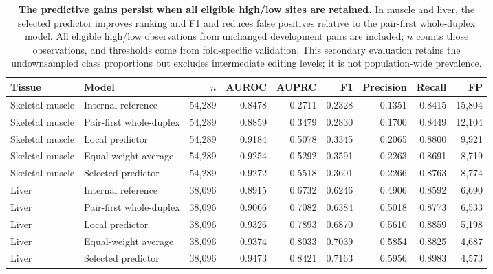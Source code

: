 \begin{table}[H]
\centering
\caption{\textbf{The predictive gains persist when all eligible high/low sites are retained.} In muscle and liver, the selected predictor improves ranking and F1 and reduces false positives relative to the pair-first whole-duplex model. All eligible high/low observations from unchanged development pairs are included; $n$ counts those observations, and thresholds come from fold-specific validation. This secondary evaluation retains the undownsampled class proportions but excludes intermediate editing levels; it is not population-wide prevalence.}\label{tab:natural}
\begin{tabular}{llrrrrrrr}
\toprule
Tissue & Model & $n$ & AUROC & AUPRC & F1 & Precision & Recall & FP \\
\midrule
Skeletal muscle & Internal reference & 54,289 & 0.8478 & 0.2711 & 0.2328 & 0.1351 & 0.8415 & 15,804 \\
Skeletal muscle & Pair-first whole-duplex & 54,289 & 0.8859 & 0.3479 & 0.2830 & 0.1700 & 0.8449 & 12,104 \\
Skeletal muscle & Local predictor & 54,289 & 0.9184 & 0.5078 & 0.3345 & 0.2065 & 0.8800 & 9,921 \\
Skeletal muscle & Equal-weight average & 54,289 & 0.9254 & 0.5292 & 0.3591 & 0.2263 & 0.8691 & 8,719 \\
Skeletal muscle & Selected predictor & 54,289 & 0.9272 & 0.5518 & 0.3601 & 0.2266 & 0.8763 & 8,774 \\
Liver & Internal reference & 38,096 & 0.8915 & 0.6732 & 0.6246 & 0.4906 & 0.8592 & 6,690 \\
Liver & Pair-first whole-duplex & 38,096 & 0.9066 & 0.7082 & 0.6384 & 0.5018 & 0.8773 & 6,533 \\
Liver & Local predictor & 38,096 & 0.9326 & 0.7893 & 0.6870 & 0.5610 & 0.8859 & 5,198 \\
Liver & Equal-weight average & 38,096 & 0.9374 & 0.8033 & 0.7039 & 0.5854 & 0.8825 & 4,687 \\
Liver & Selected predictor & 38,096 & 0.9473 & 0.8421 & 0.7163 & 0.5956 & 0.8983 & 4,573 \\
\bottomrule
\end{tabular}
\end{table}
